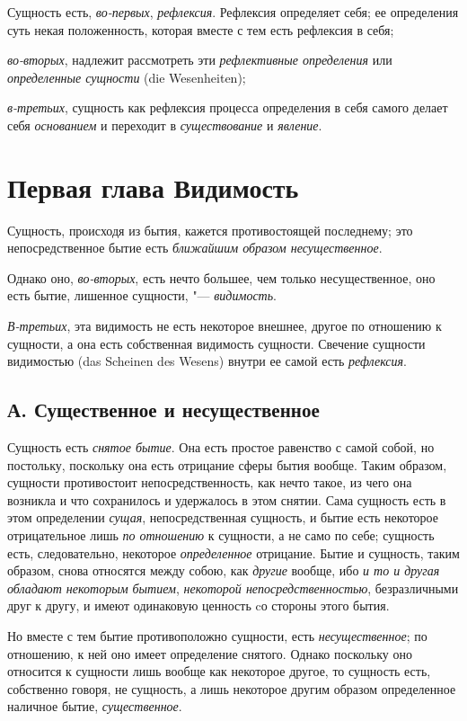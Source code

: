 Сущность есть, {\em во-первых}, {\em рефлексия}. Рефлексия определяет себя;
ее определения суть некая положенность, которая вместе с тем есть
рефлексия в себя;

{\em во-вторых}, надлежит рассмотреть эти
{\em рефлективные определения} или
{\em определенные сущности} (die Wesenheiten);

{\em в-третьих}, сущность как рефлексия процесса
определения в себя самого делает себя {\em основанием}
и переходит в {\em существование} и {\em явление}.

\chapter[{\em Первая глава} Видимость]{Первая глава Видимость}
Сущность, происходя из бытия, кажется
противостоящей последнему; это непосредственное бытие есть
{\em ближайшим образом несущественное}.

Однако оно, {\em во-вторых}, есть нечто большее, чем только
несущественное, оно есть бытие, лишенное сущности, "--- {\em видимость}.

{\em В-третьих}, эта видимость не есть некоторое
внешнее, другое по отношению к сущности, а она есть собственная видимость
сущности. Свечение сущности видимостью (das Scheinen des Wesens) внутри ее
самой есть {\em рефлексия}.

\section[А. Существенное и несущественное]{А. Существенное и несущественное}
Сущность есть {\em снятое
бытие}. Она есть простое равенство с самой собой, но постольку, поскольку
она есть отрицание сферы бытия вообще. Таким образом, сущности противостоит
непосредственность, как нечто такое, из чего она возникла и что сохранилось
и удержалось в этом снятии. Сама сущность есть в этом определении
{\em сущая}, непосредственная сущность, и бытие есть
некоторое отрицательное лишь {\em по отношению} к
сущности, а не само по себе; сущность есть, следовательно, некоторое
{\em определенное} отрицание. Бытие и сущность, таким
образом, снова относятся между собою, как {\em другие}
вообще, ибо {\em и то и другая обладают некоторым
бытием}, {\em некоторой непосредственностью}, безразличными друг к другу,
и имеют одинаковую ценность cо стороны этого бытия.

Но вместе с тем бытие противоположно сущности, есть
{\em несущественное}; по отношению, к ней оно имеет
определение снятого. Однако поскольку оно относится к сущности лишь вообще
как некоторое другое, то сущность есть, собственно говоря, не сущность, а
лишь некоторое другим образом определенное наличное бытие,
{\em существенное}.

